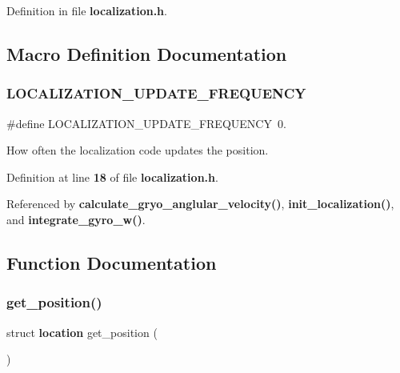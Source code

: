 Definition in file \textbf{ localization.\+h}.



\subsection{Macro Definition Documentation}
\mbox{\label{localization_8h_a4fa0a97f6aafe983a46ffc7188d1fab5}} 
\subsubsection{L\+O\+C\+A\+L\+I\+Z\+A\+T\+I\+O\+N\+\_\+\+U\+P\+D\+A\+T\+E\+\_\+\+F\+R\+E\+Q\+U\+E\+N\+CY}
{\footnotesize\ttfamily \#define L\+O\+C\+A\+L\+I\+Z\+A\+T\+I\+O\+N\+\_\+\+U\+P\+D\+A\+T\+E\+\_\+\+F\+R\+E\+Q\+U\+E\+N\+CY~0.}

How often the localization code updates the position. 

Definition at line \textbf{ 18} of file \textbf{ localization.\+h}.



Referenced by \textbf{ calculate\+\_\+gryo\+\_\+anglular\+\_\+velocity()}, \textbf{ init\+\_\+localization()}, and \textbf{ integrate\+\_\+gyro\+\_\+w()}.



\subsection{Function Documentation}
\mbox{\label{localization_8h_aadbff35bb757f60bc348d4d778f57a2f}} 
\subsubsection{get\+\_\+position()}
{\footnotesize\ttfamily struct \textbf{ location} get\+\_\+position (\begin{DoxyParamCaption}{ }\end{DoxyParamCaption})}



